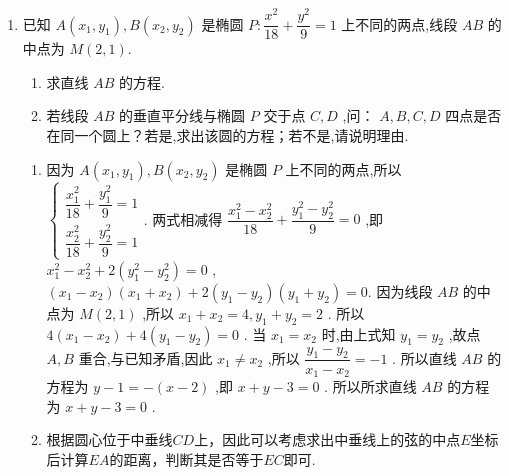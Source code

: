\begin{enumerate}
\begin{enumerate}
        \item 已知 $ A\left( {{x}_{1},{y}_{1}}\right) ,B\left( {{x}_{2},{y}_{2}}\right) $ 是椭圆 $ P : \dfrac{{x}^{2}}{18} + \dfrac{{y}^{2}}{9} = 1 $ 上不同的两点,线段 $ {AB} $ 的中点为 $ M\left( {2,1}\right) $.
        \begin{enumerate}
            \item 求直线 $ {AB} $ 的方程.
            \item 若线段 $ {AB} $ 的垂直平分线与椭圆 $ P $ 交于点 $ C,D $ ,问： $ A,B,C,D $ 四点是否在同一个圆上？若是,求出该圆的方程；若不是,请说明理由.
        \end{enumerate}
        \begin{jieda}
            \begin{enumerate}
                \item 因为 $ A\left( {{x}_{1},{y}_{1}}\right) ,B\left( {{x}_{2},{y}_{2}}\right) $ 是椭圆 $ P $ 上不同的两点,所以 $\left \{\begin{array}{l}
                     \dfrac{{x}_{1}^{2}}{18} + \dfrac{{y}_{1}^{2}}{9} = 1  \\
                     \dfrac{{x}_{2}^{2}}{18} + \dfrac{{y}_{2}^{2}}{9} = 1
                \end{array}\right.$.
                两式相减得 $ \dfrac{{x}_{1}^{2} - {x}_{2}^{2}}{18} + \dfrac{{y}_{1}^{2} - {y}_{2}^{2}}{9} = 0 $ ,即 $ {x}_{1}^{2} - {x}_{2}^{2} + 2\left( {{y}_{1}^{2} - {y}_{2}^{2}}\right)  = 0 $ ,
                $ \left( {{x}_{1} - {x}_{2}}\right) \left( {{x}_{1} + {x}_{2}}\right)  + 2\left( {{y}_{1} - {y}_{2}}\right) \left( {{y}_{1} + {y}_{2}}\right)  = 0. $
                因为线段 $ {AB} $ 的中点为 $ M\left( {2,1}\right) $ ,所以 $ {x}_{1} + {x}_{2} = 4,{y}_{1} + {y}_{2} = 2 $ .
                所以 $ 4\left( {{x}_{1} - {x}_{2}}\right)  + 4\left( {{y}_{1} - {y}_{2}}\right)  = 0 $ .
                当 $ {x}_{1} = {x}_{2} $ 时,由上式知 $ {y}_{1} = {y}_{2} $ ,故点 $ A,B $ 重合,与已知矛盾,因此 $ {x}_{1} \neq  {x}_{2} $ ,所以 $ \dfrac{{y}_{1} - {y}_{2}}{{x}_{1} - {x}_{2}} =  - 1 $ .
                所以直线 $ {AB} $ 的方程为 $ y - 1 =  - \left( {x - 2}\right) $ ,即 $ x + y - 3 = 0 $ .
                所以所求直线 $ {{AB}} $ 的方程为 $ x + y - 3 = 0 $ .
                \item 
                根据圆心位于中垂线$CD$上，因此可以考虑求出中垂线上的弦的中点$E$坐标后计算$EA$的距离，判断其是否等于$EC$即可. 
                

\end{enumerate}
\end{jieda}
\end{enumerate}
\end{enumerate}
